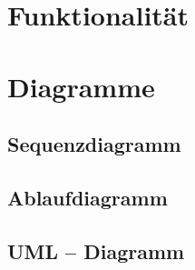 \section{Funktionalität} 
\section{Diagramme}
\subsection*{Sequenzdiagramm}
\subsection*{Ablaufdiagramm}
\subsection*{UML -- Diagramm}
